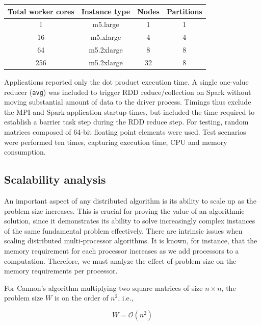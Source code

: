 \documentclass[fleqn,10pt]{SelfArx} %
\begin{document}
\begin{center}
	\begin{tabular}{ |c|c|c|c| } 
	 \hline
	 Total worker cores & Instance type & Nodes & Partitions  \\ 
	 \hline\hline
	 1 & m5.large & 1 & 1 \\ 
	 \hline
	 16 & m5.xlarge & 4 & 4 \\ 
	 \hline
	 64 & m5.2xlarge & 8 & 8 \\ 
	 \hline
	 256 & m5.2xlarge & 32 & 8 \\ 
	 \hline
	\end{tabular}
\end{center}
	

Applications reported only the dot product execution time. A single one-value reducer (\texttt{avg}) was included to trigger RDD reduce/collection on Spark without moving substantial amount of data to the driver process. Timings thus exclude the MPI and Spark application startup times, but included the time required to establish a barrier task step during the RDD reduce step. For testing, random matrices composed of 64-bit floating point elements were used. Test scenarios were performed ten times, capturing execution time, CPU and memory consumption.


\subsection{Scalability analysis} %
\label{sub:scalability_analysis}


An important aspect of any distributed algorithm is its ability to scale up as the problem size increases. This is crucial for proving the value of an algorithmic solution, since it demonstrates its ability to solve increasingly complex instances of the same fundamental problem effectively. There are intrinsic issues when scaling distributed multi-processor algorithms. It is known, for instance, that the memory requirement for each processor increases as we add processors to a computation. Therefore, we must analyze the effect of problem size on the memory requirements per processor. 

For Cannon's algorithm multiplying two square matrices of size $n \times n$, the problem size $W$ is on the order of $n^2$, i.e.,

\begin{equation}
	W = \mathcal{O}(n^2)
	\label{eq:problem_size}
\end{equation}
\end{document}
